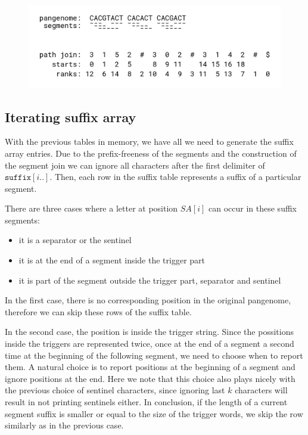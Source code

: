 \begin{figure}
    \centering
    \includegraphics[width=\linewidth]{images/path_join.png}
    \caption{}
    \label{fig:path_join}
\end{figure}



\subsection{Iterating suffix array}
With the previous tables in memory, we have all we need to generate the suffix
array entries.
Due to the prefix-freeness of the segments and the construction of the segment join
we can ignore all characters after the first delimiter of $\texttt{suffix}[i..]$.
Then, each row in the suffix table represents a suffix of a particular segment.

There are three cases where a letter at position $SA[i]$ can occur in these suffix segments:
\begin{itemize}
    \item it is a separator or the sentinel
    \item it is at the end of a segment inside the trigger part
    \item it is part of the segment outside the trigger part, separator and sentinel
\end{itemize}

In the first case, there is no corresponding position in the original pangenome,
therefore we can skip these rows of the suffix table.

In the second case, the position is inside the trigger string.
Since the possitions inside the triggers are represented twice, once at the end
of a segment a second time at the beginning of the following segment, we need
to choose when to report them.
A natural choice is to report positions at the beginning of a segment and ignore
positions at the end.
Here we note that this choice also plays nicely with the previous choice of sentinel
characters, since ignoring last $k$ characters will result in not printing
sentinels either.
In conclusion, if the length of a current segment suffix is smaller or equal to
the size of the trigger words, we skip the row similarly as in the previous case.

